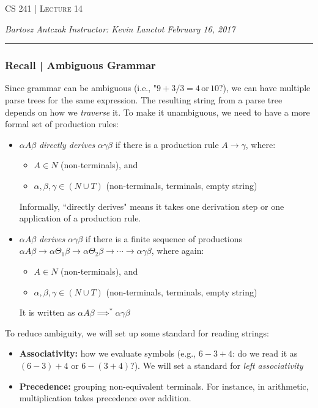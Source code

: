 \documentclass{report}
\newcommand{\lectureNum}{14}
\newcommand{\curDate}{February 16, 2017}
\newcommand{\course}{CS 241}
\newcommand{\instructor}{Kevin Lanctot}
\begin{document}
\begin{center}
\begin{Large}
\textsc{\course{} | Lecture \lectureNum{}}
\end{Large}
\end{center} 
\noindent \textit{Bartosz Antczak} \hfill
\textit{Instructor: \instructor{}} \hfill
\textit{\curDate{}}
\rule{\textwidth}{0.4pt}
\subsubsection{Recall | Ambiguous Grammar}
Since grammar can be ambiguous (i.e., "$9 + 3 / 3 = 4 \,\mathrm{or} \, 10?$), we can have multiple parse trees for the same expression. The resulting string from a parse tree depends on how we \textit{traverse} it. To make it unambiguous, we need to have a more formal set of production rules:
\begin{itemize}
\item $\alpha A \beta$ \textit{directly derives} $\alpha \gamma \beta$ if there is a production rule $A \rightarrow \gamma$, where:
\begin{itemize}
\item $A \in N$ (non-terminals), and
\item $\alpha, \beta, \gamma \in (N \cup T)$ (non-terminals, terminals, empty string)
\end{itemize}
Informally, ``directly derives" means it takes one derivation step or one application of a production rule.
\item $\alpha A \beta$ \textit{derives} $\alpha \gamma \beta$ if there is a finite sequence of productions $\alpha A \beta \rightarrow \alpha \Theta_1 \beta \rightarrow \alpha \Theta_2 \beta \rightarrow \cdots \rightarrow \alpha \gamma \beta$, where again:
\begin{itemize}
\item $A \in N$ (non-terminals), and
\item $\alpha, \beta, \gamma \in (N \cup T)$ (non-terminals, terminals, empty string)
\end{itemize}
It is written as $\alpha A \beta \implies^* \alpha \gamma \beta$
\end{itemize}
To reduce ambiguity, we will set up some standard for reading strings:
\begin{itemize}
\item \textbf{Associativity:} how we evaluate symbols (e.g., $6 - 3 + 4$: do we read it as $(6-3)+4$ or $6 - (3+4)$?). We will set a standard for \textit{left associativity}
\item \textbf{Precedence:} grouping non-equivalent terminals. For instance, in arithmetic, multiplication takes precedence over addition.
\end{itemize}
\end{document}

